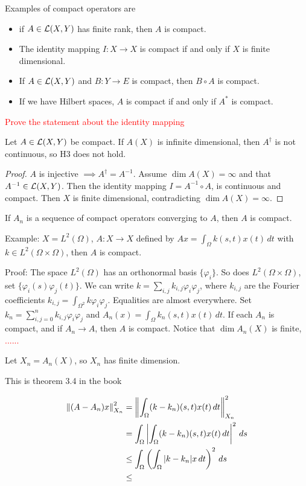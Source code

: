\documentclass[12pt]{article}
\begin{document}
Examples of compact operators are 
\begin{itemize}
    \item if $A\in\mathcal{L}(X,Y)$ has finite rank, then $A$ is compact.
    \item The identity mapping $I:X\to X$ is compact if and only if $X$ is finite dimensional.
    \item If $A\in \mathcal{L}(X,Y)$ and $B:Y\to E$ is compact, then $B\circ A$ is compact.
    \item If we have Hilbert spaces, $A$ is compact if and only if $A^*$ is compact.
\end{itemize}
\textcolor{red}{Prove the statement about the identity mapping}

\begin{theorem}
    Let $A\in \mathcal{L}(X,Y)$ be compact. If $A(X)$ is infinite dimensional, then $A^\dagger $ is not continuous, so H3 does not hold.
\end{theorem}
\begin{proof}
    $A$ is injective $\implies A^\dagger =A^{-1}$. Assume $\dim A(X)=\infty$ and that $A^{-1}\in \mathcal{L}(X,Y)$. Then the identity mapping $I=A^{-1}\circ A$, is continuous and compact. Then $X$ is finite dimensional, contradicting $\dim A(X)=\infty$. 
\end{proof}

\begin{theorem}
    If $A_n$ is a sequence of compact operators converging to $A$, then $A$ is compact.
\end{theorem}

Example: $X=L^2(\Omega)$, $A:X\to X$ defined by $Ax=\int_\Omega k(s,t)x(t) \,dt$ with $k\in L^2(\Omega\times \Omega)$, then $A$ is compact.

Proof: The space $L^2(\Omega)$ has an orthonormal basis $\{\varphi_i\}$. So does $L^2(\Omega\times \Omega)$, set $\{\varphi_i(s)\varphi_j(t)\}$. We can write $k = \sum_{i,j} k_{i,j}\varphi_i\varphi_j$, where $k_{i,j}$ are the Fourier coefficients $k_{i,j} = \int_{\Omega^2}k\varphi_i\varphi_j$. Equalities are almost everywhere. Set $k_n = \sum_{i,j=0}^n k_{i,j}\varphi_i\varphi_j$ and $A_n(x) =\int_\Omega k_n(s,t)x(t)\,dt $. If each $A_n$ is compact, and if $A_n\to A$, then $A$ is compact. Notice that $\dim A_n(X)$ is finite, \textcolor{red}{......}

Let $X_n=A_n(X)$, so $X_n$ has finite dimension. 

This is theorem 3.4 in the book

\begin{equation*}
    \begin{aligned}
    \left\lVert(A-A_n)x\right\rVert^2_{X_n} &= \left\lVert\int_{\Omega} (k-k_n)(s,t)x(t)\, dt\right\rVert_{X_n}^2\\
                            &= \int_{\Omega} \left|  \int_{\Omega} (k-k_n)(s,t)x(t)\, dt \right|^2 \,ds\\
                            &\leq \int_\Omega \left( \int_\Omega|k-k_n|x\,dt \right)^2 \,ds\\
                            &\leq 
    \end{aligned}
\end{equation*}
\end{document}
